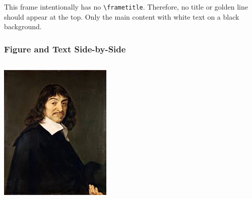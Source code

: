 \documentclass[12pt,notes]{beamer} %
\begin{document}
	
	\begin{frame}
		This frame intentionally has no \texttt{\textbackslash frametitle}.
		Therefore, no title or golden line should appear at the top.
		Only the main content with white text on a black background.
	\end{frame}
	
	\begin{frame}
		\frametitle{Figure and Text Side-by-Side} %
		
		\begin{columns}[T] %
			
			\begin{column}{0.50\textwidth} %
				\centering %
				\includegraphics[width=0.8\linewidth]{dikaer.jpg}
				
			\end{column}
			

\end{columns}
\end{frame}
\end{document}
